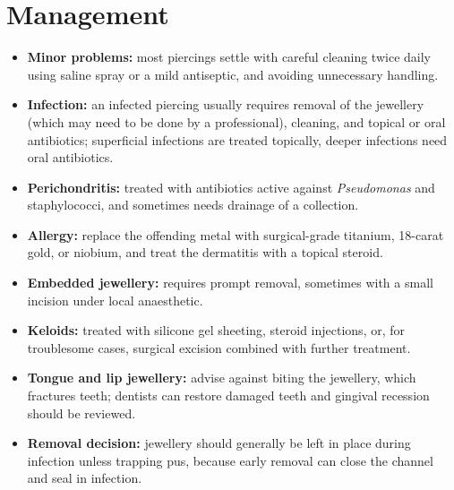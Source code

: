 \section*{Management}
\begin{itemize}
    \item \textbf{Minor problems:} most piercings settle with careful cleaning twice daily using saline spray or a mild antiseptic, and avoiding unnecessary handling.
    \item \textbf{Infection:} an infected piercing usually requires removal of the jewellery (which may need to be done by a professional), cleaning, and topical or oral antibiotics; superficial infections are treated topically, deeper infections need oral antibiotics.
    \item \textbf{Perichondritis:} treated with antibiotics active against \textit{Pseudomonas} and staphylococci, and sometimes needs drainage of a collection.
    \item \textbf{Allergy:} replace the offending metal with surgical-grade titanium, 18-carat gold, or niobium, and treat the dermatitis with a topical steroid.
    \item \textbf{Embedded jewellery:} requires prompt removal, sometimes with a small incision under local anaesthetic.
    \item \textbf{Keloids:} treated with silicone gel sheeting, steroid injections, or, for troublesome cases, surgical excision combined with further treatment.
    \item \textbf{Tongue and lip jewellery:} advise against biting the jewellery, which fractures teeth; dentists can restore damaged teeth and gingival recession should be reviewed.
    \item \textbf{Removal decision:} jewellery should generally be left in place during infection unless trapping pus, because early removal can close the channel and seal in infection.
\end{itemize}

